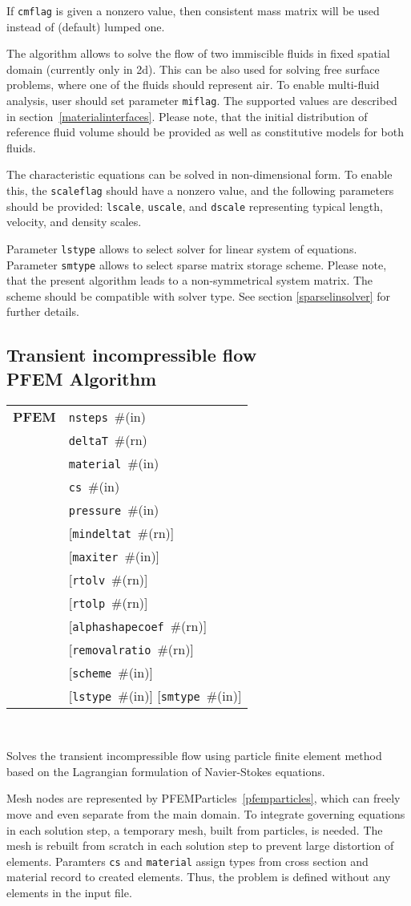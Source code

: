 \documentclass[a4paper]{article}
\newcommand{\param}[1]{\texttt{#1}} %
\newcommand{\optional}[1]{[#1]} %
\newcommand{\field}[2]{\param{#1}~\#{\tiny(#2)}} %
\newcommand{\optField}[2]{\optional{\field{#1}{#2}}}
\newcommand{\entKeywordInst}[1]{\textbf{#1}} %
\newenvironment{record}[1][]{\begin{tabular}{|ll}}{\end{tabular}\\}
\newcommand{\recentry}[2]{{#1}&{#2}\\}
\newcounter{rcc}
\newenvironment{record}[1][\textwidth]{\setcounter{rcc}{0}\rowcolors{1}{lightgray}{lightgray}\tabularx{#1}{llR} \hline}
               {\endtabularx}
\newcommand{\recentry}[2]{\ifthenelse{\value{rcc}>0}{$\backslash$ \\}{\setcounter{rcc}{1}}{#1}&{#2}&}
\begin{document}
If \param{cmflag} is given a nonzero value, then
consistent mass matrix will be used instead of (default) lumped one.

The algorithm allows to solve the flow of two immiscible fluids in
fixed spatial domain (currently only in 2d). This can be also used for
solving free surface problems, where one of the fluids should
represent air. To enable multi-fluid analysis, user should set parameter \param{miflag}. The supported values are described in section~\ref{materialinterfaces}.
Please note, that the initial distribution of reference fluid
volume should be provided as well as
constitutive models for both fluids.


The characteristic equations can be solved in non-dimensional form. To
enable this, the \param{scaleflag} should have a nonzero value,
and the following parameters should be provided: \param{lscale},
\param{uscale}, and \param{dscale} representing typical length,
velocity, and density scales.

Parameter \param{lstype} allows to select solver for linear system of
equations. Parameter \param{smtype} allows to select sparse matrix storage
scheme. Please note, that the present algorithm leads to a
non-symmetrical system
matrix. The scheme should be compatible with solver type. See section
\ref{sparselinsolver} for further details.

\subsection{Transient incompressible flow\\PFEM Algorithm}
\label{pfemIncomp}
\begin{record}
  \recentry{\entKeywordInst{PFEM}}{\field{nsteps}{in}}
  \recentry{}{\field{deltaT}{rn}}
  \recentry{}{\field{material}{in}}
  \recentry{}{\field{cs}{in}}
  \recentry{}{\field{pressure}{in}}
  \recentry{}{\optField{mindeltat}{rn}}
  \recentry{}{\optField{maxiter}{in}}
  \recentry{}{\optField{rtolv}{rn}}
  \recentry{}{\optField{rtolp}{rn}}
  \recentry{}{\optField{alphashapecoef}{rn}}
  \recentry{}{\optField{removalratio}{rn}}
  \recentry{}{\optField{scheme}{in}}
  \recentry{}{\optField{lstype}{in} \optField{smtype}{in}}
\end{record}

Solves the transient incompressible flow using particle finite element
method based on the Lagrangian formulation of Navier-Stokes equations.

Mesh nodes are represented by PFEMParticles~\ref{pfemparticles}, which 
can freely move and even separate from the main domain. To integrate 
governing equations in each solution step, a temporary mesh, built from 
particles, is needed. The mesh is rebuilt from scratch in each solution 
step to prevent large distortion of elements. Paramters \param{cs} and
\param{material} assign types from cross section and material record to 
created elements. Thus, the problem is defined without any elements in
the input file.
\end{document}
